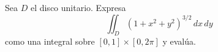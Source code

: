 Sea \( D \) el disco unitario. Expresa
\[
\iint_D (1 + x^2 + y^2)^{3/2}\, dx\, dy
\]
como una integral sobre \([0, 1] \times [0, 2\pi]\) y evalúa.
